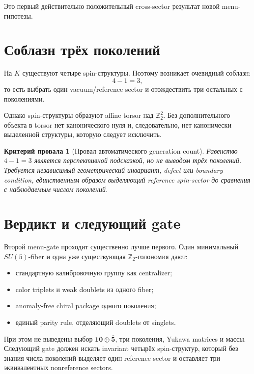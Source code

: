 \documentclass[12pt,a4paper]{article}
\newtheorem{nogocriterion}{Критерий провала}
\begin{document}
Это первый действительно положительный cross-sector результат новой menu-гипотезы.

\section{Соблазн трёх поколений}

На \(K\) существуют четыре spin-структуры. Поэтому возникает очевидный соблазн:
\[
4-1=3,
\]
то есть выбрать один vacuum/reference sector и отождествить три остальных с поколениями.

Однако spin-структуры образуют affine torsor над \(\mathbb Z_2^2\). Без дополнительного объекта в torsor нет канонического нуля и, следовательно, нет канонически выделенной структуры, которую следует исключить.

\begin{nogocriterion}[Провал автоматического generation count]
Равенство \(4-1=3\) является перспективной подсказкой, но не выводом трёх поколений. Требуется независимый геометрический инвариант, defect или boundary condition, единственным образом выделяющий reference spin-sector до сравнения с наблюдаемым числом поколений.
\end{nogocriterion}

\section{Вердикт и следующий gate}

Второй menu-gate проходит существенно лучше первого. Один минимальный \(SU(5)\)-fiber и одна уже существующая \(\mathbb Z_2\)-голономия дают:
\begin{itemize}
    \item стандартную калибровочную группу как centralizer;
    \item color triplets и weak doublets из одного fiber;
    \item anomaly-free chiral package одного поколения;
    \item единый parity rule, отделяющий doublets от singlets.
\end{itemize}

При этом не выведены выбор \(\mathbf{10}\oplus\overline{\mathbf5}\), три поколения, Yukawa matrices и массы. Следующий gate должен искать invariant четырёх spin-структур, который без знания числа поколений выделяет один reference sector и оставляет три эквивалентных nonreference sectors.
\end{document}
